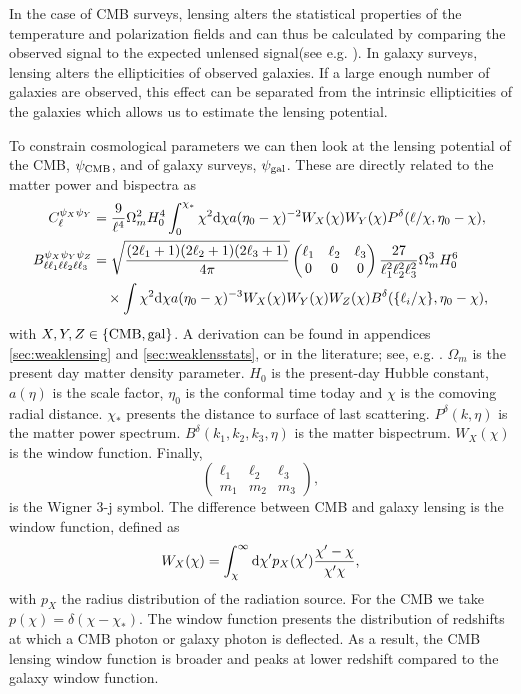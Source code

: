 \documentclass[11pt]{article} %
\DeclareRobustCommand{\d}{\ifmmode\text{d}\else d\fi}
\DeclareRobustCommand{\CMB}{\ifmmode\text{CMB}\else d\fi}
\DeclareRobustCommand{\gal}{\ifmmode\text{gal}\else d\fi}
\begin{document}
In the case of CMB surveys, lensing alters the statistical properties of the temperature and polarization fields and can thus be calculated by comparing the observed signal to the expected unlensed signal(see e.g. \cite{cmblensingestimator}). In galaxy surveys, lensing alters the ellipticities of observed galaxies. If a large enough number of galaxies are observed, this effect can be separated from the intrinsic ellipticities of the galaxies which allows us to estimate the lensing potential.

To constrain cosmological parameters we can then look at the lensing potential of the CMB, $\psi_\CMB$, and of galaxy surveys, $\psi_\gal$. These are directly related to the matter power and bispectra as
\begin{align}%
    C^{\psi_X\psi_Y}_\ell
    & = \frac{9}{\ell^4}\Omega_m^2H_0^4\int_0^{\chi_*} \chi^2 \d\chi a(\eta_0-\chi)^{-2}W_X(\chi)W_Y(\chi)P^\delta(\ell/\chi,\eta_0-\chi),\\
    B^{\psi_X\psi_Y\psi_Z}_{\ell\ell_1\ell\ell_2\ell\ell_3} &= \sqrt{\frac{(2\ell_1 + 1)(2\ell_2 + 1)(2\ell_3 + 1)}{4\pi}} \begin{pmatrix} \ell_1 & \ell_2 & \ell_3 \\ 0 & 0 & 0 \end{pmatrix} \frac{27}{\ell_1^2\ell_2^2\ell_3^2}\Omega_m^3H_0^6\\
    & \quad \times \int \chi^2\d \chi a(\eta_0-\chi)^{-3}W_X(\chi)W_Y(\chi)W_Z(\chi)  B^\delta(\{\ell_i/\chi\}, \eta_0-\chi),
\end{align}
with $X, Y, Z \in \{\CMB, \gal\}$. A derivation can be found in appendices \ref{sec:weaklensing} and \ref{sec:weaklensstats}, or in the literature; see, e.g. \cite{bartelmann2001weak}. $\Omega_m$ is the present day matter density parameter. $H_0$ is the present-day Hubble constant, $a(\eta)$ is the scale factor, $\eta_0$ is the conformal time today and $\chi$ is the comoving radial distance. $\chi_*$ presents the distance to surface of last scattering. $P^\delta(k, \eta)$ is the matter power spectrum. $B^\delta(k_1, k_2, k_3, \eta)$ is the matter bispectrum. $W_X(\chi)$ is the window function. Finally,
$$
\begin{pmatrix}
    \ell_1&\ell_2&\ell_3 \\ m_1 & m_2 & m_3
\end{pmatrix},
$$ 
is the Wigner 3-j symbol. The difference between CMB and galaxy lensing is the window function, defined as
\begin{equation*}
    W_X(\chi) = \int_\chi^{\infty}\d\chi' p_X(\chi')\frac{\chi'-\chi}{\chi'\chi},
\end{equation*}
with $p_X$ the radius distribution of the radiation source. For the CMB we take $p(\chi) = \delta(\chi - \chi_*)$. The window function presents the distribution of redshifts at which a CMB photon or galaxy photon is deflected. As a result, the CMB lensing window function is broader and peaks at lower redshift compared to the galaxy window function.
\end{document}
